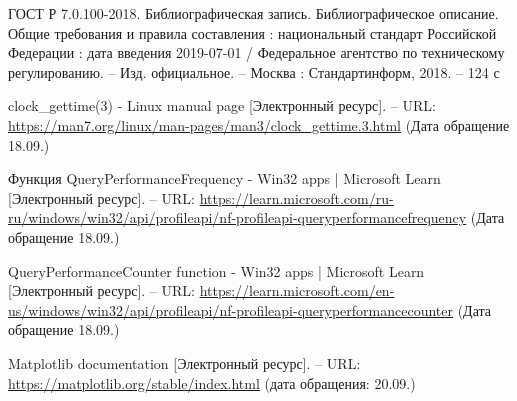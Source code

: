 
\renewcommand\bibname{Список использованной литературы}

\begin{thebibliography}{}

    ГОСТ Р 7.0.100-2018. Библиографическая запись. Библиографическое 
    описание. Общие требования и правила составления : национальный 
    стандарт Российской Федерации : дата введения 2019-07-01 / Федеральное 
    агентство по техническому регулированию. – Изд. официальное. – Москва : 
    Стандартинформ, 2018. – 124 с

    clock\_gettime(3) - Linux manual page [Электронный ресурс].
    -- URL: \url{https://man7.org/linux/man-pages/man3/clock_gettime.3.html}
    (Дата обращение 18.09.\the\year)

    Функция QueryPerformanceFrequency - Win32 apps | Microsoft Learn [Электронный ресурс].
    -- URL: \url{https://learn.microsoft.com/ru-ru/windows/win32/api/profileapi/nf-profileapi-queryperformancefrequency}
    (Дата обращение 18.09.\the\year)

    QueryPerformanceCounter function - Win32 apps | Microsoft Learn [Электронный ресурс].
    -- URL: \url{https://learn.microsoft.com/en-us/windows/win32/api/profileapi/nf-profileapi-queryperformancecounter}
    (Дата обращение 18.09.\the\year)

     Matplotlib documentation [Электронный ресурс]. -- URL: \url{https://matplotlib.org/stable/index.html} (дата обращения: 20.09.\the\year)

\end{thebibliography}